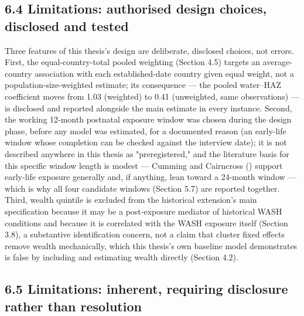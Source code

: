 \subsection*{6.4 Limitations: authorised design choices, disclosed and tested}

Three features of this thesis's design are deliberate, disclosed choices, not errors. First, the equal-country-total pooled weighting (Section 4.5) targets an average-country association with each established-date country given equal weight, not a population-size-weighted estimate; its consequence --- the pooled water--HAZ coefficient moves from 1.03 (weighted) to 0.41 (unweighted, same observations) --- is disclosed and reported alongside the main estimate in every instance. Second, the working 12-month postnatal exposure window was chosen during the design phase, before any model was estimated, for a documented reason (an early-life window whose completion can be checked against the interview date); it is not described anywhere in this thesis as "preregistered," and the literature basis for this specific window length is modest --- Cumming and Cairncross (\citeyear{CummingCairncross2016}) support early-life exposure generally and, if anything, lean toward a 24-month window --- which is why all four candidate windows (Section 5.7) are reported together. Third, wealth quintile is excluded from the historical extension's main specification because it may be a post-exposure mediator of historical WASH conditions and because it is correlated with the WASH exposure itself (Section 3.8), a substantive identification concern, not a claim that cluster fixed effects remove wealth mechanically, which this thesis's own baseline model demonstrates is false by including and estimating wealth directly (Section 4.2).

\subsection*{6.5 Limitations: inherent, requiring disclosure rather than resolution}

